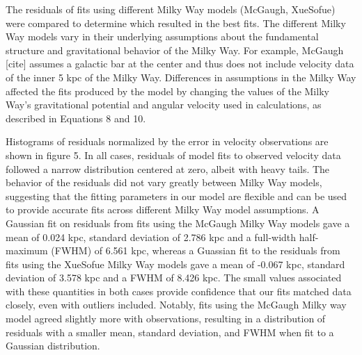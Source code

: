 \documentclass[reprint,%
 amsmath,amssymb,
 aps,
]{revtex4-1}
\begin{document}
The residuals of fits using different Milky Way models (McGaugh, XueSofue) were compared to determine which resulted in the best fits. The different Milky Way models vary in their underlying assumptions about the fundamental structure and gravitational behavior of the Milky Way. For example, McGaugh [cite] assumes a galactic bar at the center and thus does not include velocity data of the inner 5 kpc of the Milky Way. Differences in assumptions in the Milky Way affected the fits produced by the model by changing the values of the Milky Way's gravitational potential and angular velocity used in calculations, as described in Equations 8 and 10. 

Histograms of residuals normalized by the error in velocity observations are shown in figure 5. In all cases, residuals of model fits to observed velocity data followed a narrow distribution centered at zero, albeit with heavy tails. The behavior of the residuals did not vary greatly between Milky Way models, suggesting that the fitting parameters in our model are flexible and can be used to provide accurate fits across different Milky Way model assumptions. A Gaussian fit on residuals from fits using the McGaugh Milky Way models gave a mean of 0.024 kpc, standard deviation of 2.786 kpc and a full-width half-maximum (FWHM) of 6.561 kpc, whereas a Guassian fit to the residuals from fits using the XueSofue Milky Way models gave a mean of -0.067 kpc, standard deviation of 3.578 kpc and a FWHM of  8.426 kpc. The small values associated with these quantities in both cases provide confidence that our fits matched data closely, even with outliers included. Notably, fits using the McGaugh Milky way model agreed slightly more with observations, resulting in a distribution of residuals with a smaller mean, standard deviation, and FWHM when fit to a Gaussian distribution.
\end{document}
